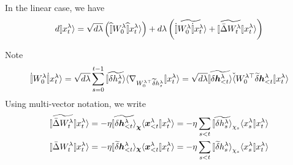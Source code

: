 \documentclass{article}
\theoremstyle{plain}
\theoremstyle{definition}
\begin{document}
In the linear case, we have
\[
d\ket{x_{t}^{\lambda}}=\sqrt{d\lambda}\left(\hatoplim{W_{0}^{\lambda}}x_{t}^{\lambda}\ra\right)+d\lambda\left(\widetilde{\dotoplim{W_{0}^{\lambda}}x_{t}^{\lambda}\ra}+\oplim{\widetilde{\bar{\Delta}W_{t}^{\lambda}}}x_{t}^{\lambda}\ra\right)
\]

Note
\[
\dotoplim{W_{0}^{\lambda}}x_{t}^{\lambda}\ra=\sqrt{d\lambda}\sum_{s=0}^{t-1}\widetilde{\ket{\delta h_{s}^{\lambda}}}\bra{\nabla_{W_{0}^{\lambda\trsp}\tilde\delta h_{s}^{\lambda}}}x_{t}^{\lambda}\ra=\sqrt{d\lambda}\widetilde{\ket{\delta\hh_{<t}^{\lambda}}}\dbra{W_{0}^{\lambda\trsp}\tilde\delta\hh_{<t}^{\lambda}}x_{t}^{\lambda}\ra
\]
Using multi-vector notation, we write
\begin{align*}
\oplim{\widetilde{\bar{\Delta}W_{t}^{\lambda}}}x_{t}^{\lambda}\ra & =-\eta\widetilde{\ket{\delta\hh_{<t}^{\lambda}}}_{\cchi}\braket{\xx_{<t}^{\lambda}}{x_{t}^{\lambda}} =-\eta \sum_{s<t} \widetilde{\ket{\delta h_{s}^{\lambda}}}_{\chi_s}\braket{x_{s}^{\lambda}}{x_{t}^{\lambda}}\\
\oplim{\bar{\Delta}W_{t}^{\lambda}}x_{t}^{\lambda}\ra & =-\eta\ket{\tilde\delta\hh_{<t}^{\lambda}}_{\cchi}\braket{\xx_{<t}^{\lambda}}{x_{t}^{\lambda}}  =-\eta \sum_{s<t} {\ket{\tilde\delta h_{s}^{\lambda}}}_{\chi_s}\braket{x_{s}^{\lambda}}{x_{t}^{\lambda}}
\end{align*}
\end{document}
